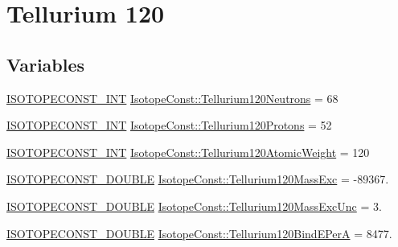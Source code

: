 \hypertarget{group___isotope_const-_tellurium-_te120}{}\section{Tellurium 120}
\label{group___isotope_const-_tellurium-_te120}
\subsection*{Variables}
\begin{DoxyCompactItemize}
\item 
\mbox{\hyperlink{group___isotope_const-_macros_ga5f18360b3e99483a35c32d789e62621c}{I\+S\+O\+T\+O\+P\+E\+C\+O\+N\+S\+T\+\_\+\+I\+NT}} \mbox{\hyperlink{group___isotope_const-_tellurium-_te120_ga91b9744188b0d1384f86371cca70c21e}{Isotope\+Const\+::\+Tellurium120\+Neutrons}} = 68
\item 
\mbox{\hyperlink{group___isotope_const-_macros_ga5f18360b3e99483a35c32d789e62621c}{I\+S\+O\+T\+O\+P\+E\+C\+O\+N\+S\+T\+\_\+\+I\+NT}} \mbox{\hyperlink{group___isotope_const-_tellurium-_te120_ga1dd21be578a1960b402557f373e49c89}{Isotope\+Const\+::\+Tellurium120\+Protons}} = 52
\item 
\mbox{\hyperlink{group___isotope_const-_macros_ga5f18360b3e99483a35c32d789e62621c}{I\+S\+O\+T\+O\+P\+E\+C\+O\+N\+S\+T\+\_\+\+I\+NT}} \mbox{\hyperlink{group___isotope_const-_tellurium-_te120_ga842f09fc762dd979f82d03b23f6bb1ad}{Isotope\+Const\+::\+Tellurium120\+Atomic\+Weight}} = 120
\item 
\mbox{\hyperlink{group___isotope_const-_macros_ga8f45a7272ce02c0b4c65c44636ed719a}{I\+S\+O\+T\+O\+P\+E\+C\+O\+N\+S\+T\+\_\+\+D\+O\+U\+B\+LE}} \mbox{\hyperlink{group___isotope_const-_tellurium-_te120_gaea46340615ca80fb2f7465399634c640}{Isotope\+Const\+::\+Tellurium120\+Mass\+Exc}} = -\/89367.
\item 
\mbox{\hyperlink{group___isotope_const-_macros_ga8f45a7272ce02c0b4c65c44636ed719a}{I\+S\+O\+T\+O\+P\+E\+C\+O\+N\+S\+T\+\_\+\+D\+O\+U\+B\+LE}} \mbox{\hyperlink{group___isotope_const-_tellurium-_te120_ga7e38cc98fbfa6e35d1840da796accb8e}{Isotope\+Const\+::\+Tellurium120\+Mass\+Exc\+Unc}} = 3.
\item 
\mbox{\hyperlink{group___isotope_const-_macros_ga8f45a7272ce02c0b4c65c44636ed719a}{I\+S\+O\+T\+O\+P\+E\+C\+O\+N\+S\+T\+\_\+\+D\+O\+U\+B\+LE}} \mbox{\hyperlink{group___isotope_const-_tellurium-_te120_ga3fad3c8a20fe38f3a1b253b44a8f1329}{Isotope\+Const\+::\+Tellurium120\+Bind\+E\+PerA}} = 8477.
\item 

\end{DoxyCompactItemize}
